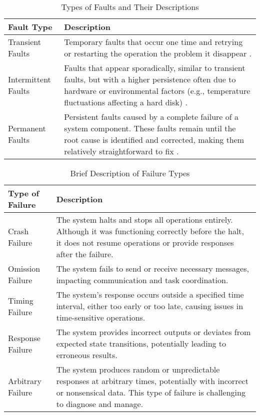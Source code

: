\begin{table}[h!]
    \centering
    \begin{tabular}{|l|p{10.8cm}|}
        \hline
        \textbf{Fault Type} & \textbf{Description} \\ \hline
        Transient Faults & Temporary faults that occur one time and retrying or restarting the operation the problem it disappear \cite{Reghenzani2023,Tanenbaum2023}. \\ \hline
        Intermittent Faults & Faults that appear sporadically, similar to transient faults, but with a higher persistence often due to hardware or environmental factors (e.g., temperature fluctuations affecting a hard disk) \cite{Reghenzani2023,Isukapalli2024}. \\ \hline
        Permanent Faults & Persistent faults caused by a complete failure of a system component. These faults remain until the root cause is identified and corrected, making them relatively straightforward to fix \cite{Reghenzani2023}. \\ \hline
    \end{tabular}
    \caption{Types of Faults and Their Descriptions}
    \label{tab:fault_types}
\end{table}

\begin{table}[h!]
	\centering
	\begin{tabular}{|l|p{11cm}|}
		\hline
		\textbf{Type of Failure} & \textbf{Description} \\ \hline
		Crash Failure            & The system halts and stops all operations entirely. Although it was functioning correctly before the halt, it does not resume operations or provide responses after the failure. \cite{Tanenbaum2023} \\ \hline
		Omission Failure         & The system fails to send or receive necessary messages, impacting communication and task coordination. \cite{Haider2011} \\ \hline
		Timing Failure           & The system’s response occurs outside a specified time interval, either too early or too late, causing issues in time-sensitive operations. \cite{Isukapalli2024} \\ \hline
		Response Failure         & The system provides incorrect outputs or deviates from expected state transitions, potentially leading to erroneous results. \cite{Tanenbaum2023} \\ \hline
		Arbitrary Failure        & The system produces random or unpredictable responses at arbitrary times, potentially with incorrect or nonsensical data. This type of failure is challenging to diagnose and manage. \cite{Tanenbaum2023} \\ \hline
	\end{tabular}
	\caption{Brief Description of Failure Types}
	\label{tab:failure_types}
\end{table}


